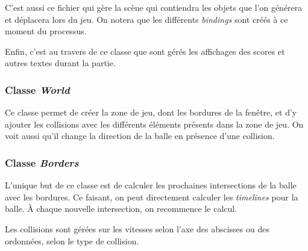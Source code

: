 \documentclass[a4paper,10pt]{article}
\theoremstyle{definition}
\begin{document}
	C'est aussi ce fichier qui gère la scène qui contiendra les objets que l'on générera et déplacera lors du jeu. On notera que les différents \emph{bindings} sont créés à ce moment du processus.
	
	Enfin, c'est au travers de ce classe que sont gérés les affichages des scores et autres textes durant la partie.
	
        \subsubsection{Classe \emph{World}}
        Ce classe permet de créer la zone de jeu, dont les bordures de la fenêtre, et d'y ajouter les collisions avec les différents éléments présents dans la zone de jeu. On voit aussi qu'il change la direction de la balle en présence d'une collision.
        
        \subsubsection{Classe \emph{Borders}}
        L'unique but de ce classe est de calculer les prochaines intersections de la balle avec les bordures. Ce faisant, on peut directement calculer les \emph{timelines} pour la balle. À chaque nouvelle intersection, on recommence le calcul.
        
        Les collisions sont gérées sur les vitesses selon l'axe des abscisses ou des ordonnées, selon le type de collision. 
\end{document}
